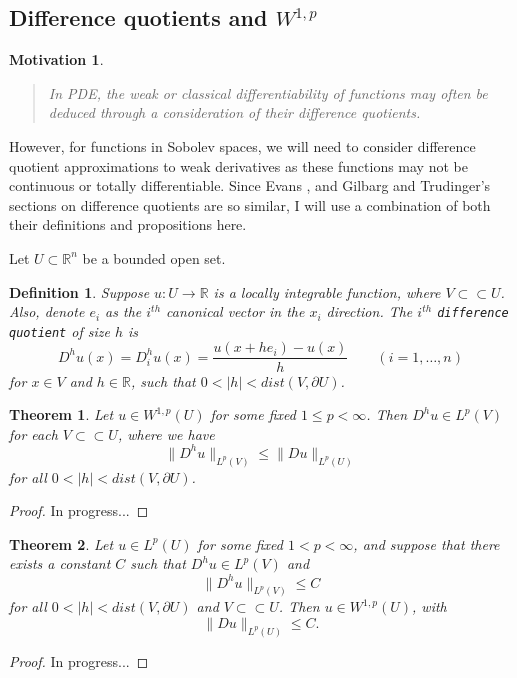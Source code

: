 \documentclass[11pt]{article}
\newtheorem{theorem}{Theorem}
\newtheorem{definition}{Definition}
\theoremstyle{definition}
\newtheorem*{motivation}{Motivation}
\begin{document}
\subsection{Difference quotients and $W^{1,p}$}
\begin{motivation}
	\blockquote{\textit{In PDE, the weak or classical differentiability of functions may often be deduced through a consideration of their difference quotients.}}
	\cite{gilbarg2001elliptic} However, for functions in Sobolev spaces, we will need to consider difference quotient approximations to
	weak derivatives as these functions may not be continuous or totally differentiable. Since Evans \cite{evans1998partial}, and
	Gilbarg and Trudinger's \cite{gilbarg2001elliptic} sections on difference quotients are so similar, I will use a combination of
	both their definitions and propositions here.
\end{motivation}
Let $U \subset \mathbb{R}^n$ be a bounded open set.
\begin{definition}
	Suppose $u : U \rightarrow \mathbb{R}$ is a locally integrable function, where $V \subset\subset U$.
	Also, denote $e_i$ as the $i^{th}$ canonical vector in the $x_i$ direction.
	The $i^{th}$ \texttt{difference quotient} of size $h$ is
	\begin{equation*}
		D^hu(x) = D_i^hu(x) = \frac{u(x + he_i) - u(x)}{h} \qquad (i = 1,\dots,n)
	\end{equation*}
	for $x \in V$ and $h \in \mathbb{R}$, such that $0 < |h| < dist(V,\partial U)$.
\end{definition}

\begin{theorem}
	Let $u \in W^{1,p}(U)$ for some fixed $1 \leq p < \infty$. Then $D^hu \in L^p(V)$ for each $V \subset\subset U$, where we have
	\begin{equation*}
		\|D^hu\|_{L^p(V)} \leq \|Du\|_{L^p(U)}
	\end{equation*}
	for all $0 < |h| < dist(V,\partial U)$.
\end{theorem}
\begin{proof}
	In progress...
\end{proof}

\begin{theorem}
	Let $u \in L^p(U)$ for some fixed $1 < p < \infty$, and suppose that there exists a constant $C$ such that
	$D^hu \in L^p(V)$ and 
	\begin{equation*}
		\|D^hu\|_{L^p(V)} \leq C
	\end{equation*}
	for all $0 < |h| < dist(V,\partial U)$ and $V \subset\subset U$.
	Then $u \in W^{1,p}(U)$, with
	\begin{equation*}
		\|Du\|_{L^p(U)} \leq C.
	\end{equation*}
\end{theorem}
\begin{proof}
	In progress...
\end{proof}
\end{document}
